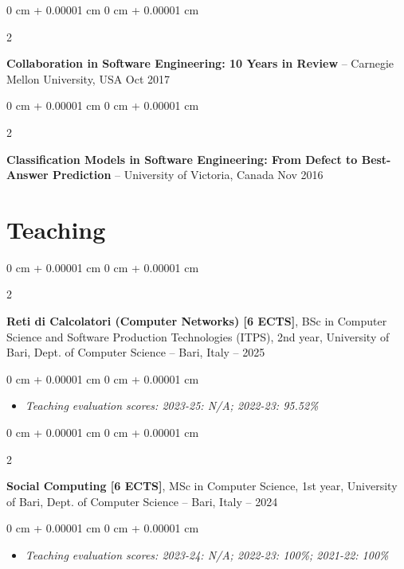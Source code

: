 \documentclass[10pt, a4paper]{article}
\newenvironment{highlights}{
    \begin{itemize}[
        topsep=0.10 cm,
        parsep=0.10 cm,
        partopsep=0pt,
        itemsep=0pt,
        leftmargin=0 cm + 10pt
    ]
}{
    \end{itemize}
} %
\newenvironment{onecolentry}{
    \begin{adjustwidth}{
        0 cm + 0.00001 cm
    }{
        0 cm + 0.00001 cm
    }
}{
    \end{adjustwidth}
} %
\newenvironment{twocolentry}[2][]{
    \onecolentry
    \def\secondColumn{#2}
    \setcolumnwidth{\fill, 4.5 cm}
    \begin{paracol}{2}
}{
    \switchcolumn \raggedleft \secondColumn
    \end{paracol}
    \endonecolentry
} %
\begin{document}
        
        \begin{twocolentry}{
            Oct 2017
        }
            \textbf{Collaboration in Software Engineering: 10 Years in Review} -- Carnegie Mellon University, USA\end{twocolentry}



        \vspace{0.2 cm}

        \begin{twocolentry}{
            Nov 2016
        }
            \textbf{Classification Models in Software Engineering: From Defect to Best-Answer Prediction} -- University of Victoria, Canada\end{twocolentry}




    
    \section{Teaching}



        
        \begin{twocolentry}{
            2022 – 2025
        }
            \textbf{Reti di Calcolatori (Computer Networks) [6 ECTS]}, BSc in Computer Science and Software Production Technologies (ITPS), 2nd year, University of Bari, Dept. of Computer Science -- Bari, Italy\end{twocolentry}

        \vspace{0.10 cm}
        \begin{onecolentry}
            \begin{highlights}
                \item \textit{Teaching evaluation scores:  2023-25: N/A; 2022-23: 95.52\%}
            \end{highlights}
        \end{onecolentry}


        \vspace{0.2 cm}

        \begin{twocolentry}{
            2021 – 2024
        }
            \textbf{Social Computing [6 ECTS]}, MSc in Computer Science, 1st year, University of Bari, Dept. of Computer Science -- Bari, Italy\end{twocolentry}

        \vspace{0.10 cm}
        \begin{onecolentry}
            \begin{highlights}
                \item \textit{Teaching evaluation scores: 2023-24: N/A; 2022-23: 100\%; 2021-22: 100\%}
            \end{highlights}
        \end{onecolentry}
\end{document}
